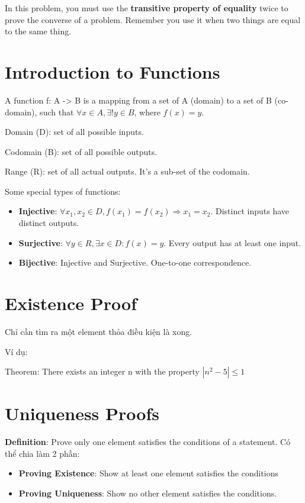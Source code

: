 In this problem, you must use the \textbf{transitive property of equality} twice to prove the converse of a problem. Remember you use it when two things are equal to the same thing.

\section{Introduction to Functions}

A function f: A -> B is a mapping from a set of A (domain) to a set of B (co-domain), such that $\forall x\in A, \exists !y \in B$, where $f(x)=y$.

Domain (D): set of all possible inputs.

Codomain (B): set of all possible outputs.

Range (R): set of all actual outputs. It's a sub-set of the codomain.

Some special types of functions:

\begin{itemize}
  \item \textbf{Injective}: $\forall x_{1}, x_{2}\in D, f(x_{1})=f(x_{2}) \Rightarrow x_{1}=x_{2}$. Distinct inputs have distinct outputs.
  \item \textbf{Surjective}: $\forall y \in R, \exists x \in D : f(x)=y$. Every output has at least one input.
  \item \textbf{Bijective}: Injective and Surjective. One-to-one correspondence.
\end{itemize}

\section{Existence Proof}

Chỉ cần tìm ra một element thỏa điều kiện là xong.

Ví dụ:

Theorem: There exists an integer n with the property $|n^{2}-5| \leq 1$

\section{Uniqueness Proofs}

\textbf{Definition}: Prove only one element satisfies the conditions of a statement. Có thể chia làm 2 phần:

\begin{itemize}
  \item \textbf{Proving Existence}: Show at least one element satisfies the conditions
  \item \textbf{Proving Uniqueness}: Show no other element satisfies the conditions.
\end{itemize}

